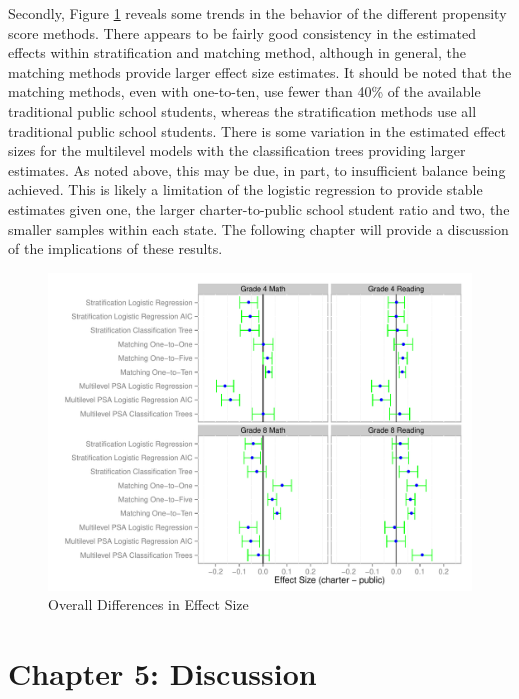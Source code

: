 \documentclass[letterpaper,12p,twoside]{article} %
\begin{document}
Secondly, Figure \ref{fig:overalldiff} reveals some trends in the behavior of the different propensity score methods. There appears to be fairly good consistency in the estimated effects within stratification and matching method, although in general, the matching methods provide larger effect size estimates. It should be noted that the matching methods, even with one-to-ten, use fewer than 40\% of the available traditional public school students, whereas the stratification methods use all traditional public school students. There is some variation in the estimated effect sizes for the multilevel models with the classification trees providing larger estimates. As noted above, this may be due, in part, to insufficient balance being achieved. This is likely a limitation of the logistic regression to provide stable estimates given one, the larger charter-to-public school student ratio and two, the smaller samples within each state. The following chapter will provide a discussion of the implications of these results.

\begin{figure}[t]
\begin{center}
\includegraphics[width=\textwidth]{../Figures2009/Overall.pdf}
\caption{Overall Differences in Effect Size}
\label{fig:overalldiff}
\end{center}
\end{figure}





\cleardoublepage
\section{Chapter 5: Discussion}
\end{document}
